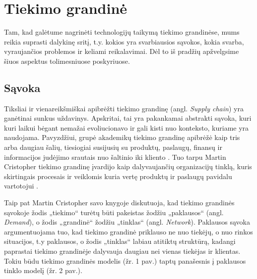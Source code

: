
\section {Tiekimo grandinė}

Tam, kad galėtume nagrinėti technologijų taikymą tiekimo grandinėse, mums reikia suprasti dalykinę sritį, t.y. kokios yra svarbiausios sąvokos, kokia svarba, vyraujančios problemos ir keliami reikalavimai. Dėl to iš pradžių apžvelgsime šiuos aspektus tolimesniuose poskyriuose.




\subsection{Sąvoka}

Tiksliai ir vienareikšmiškai apibrėžti tiekimo grandinę (angl. \textit{Supply chain}) yra ganėtinai sunkus uždavinys. Apskritai, tai yra pakankamai abstrakti sąvoka, kuri kuri laikui bėgant nemažai evoliucionavo ir gali kisti nuo konteksto, kuriame yra naudojama. Pavyzdžiui, grupė akademikų tiekimo grandinę apibrėžė kaip tris arba daugiau šalių, tiesiogiai susijusių su produktų, paslaugų, finansų ir informacijos judėjimo srautais nuo šaltinio iki kliento \cite{mentzer2001defining}. Tuo tarpu Martin Cristopher tiekimo grandinę įvardijo kaip dalyvaujančių organizacijų tinklą, kuris skirtingais procesais ir veiklomis kuria vertę produktų ir paslaugų pavidalu vartotojui \cite{christopher2016logistics}. 

Taip pat Martin Cristopher savo knygoje diskutuoja, kad tiekimo grandinės sąvokoje žodis „tiekimo“ turėtų būti pakeistas žodžiu „paklausos“ (angl. \textit{Demand}), o žodis „grandinė“ žodžiu „tinklas“ (angl. \textit{Network}). Paklausos sąvoka argumentuojama tuo, kad tiekimo grandinė priklauso ne nuo tiekėjų, o nuo rinkos situacijos, t.y paklausos, o žodis „tinklas“ labiau atitiktų struktūrą, kadangi paprastai tiekimo grandinėje dalyvauja daugiau nei vienas tiekėjas ir klientas. Tokiu būdu tiekimo grandinės modelis (žr. 1 pav.) taptų panašesnis į paklausos tinklo modelį (žr. 2 pav.).

